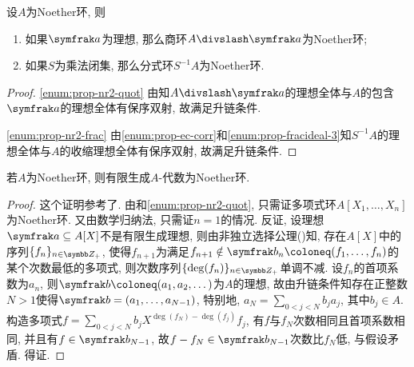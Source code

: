 
\begin{proposition}\label{prop:noetherring2}
  设$A$为Noether环, 则
  \begin{enumerate}
    \item\label{enum:prop-nr2-quot} 如果$\ideal{a}$为理想, 那么商环$A{\divslash}\ideal{a}$为Noether环;
    \item\label{enum:prop-nr2-frac} 如果$S$为乘法闭集, 那么分式环$S^{-1}A$为Noether环.
  \end{enumerate}
\end{proposition}

\begin{proof}
  \ref{enum:prop-nr2-quot} 由知$A{\divslash}\ideal{a}$的理想全体与$A$的包含$\ideal{a}$的理想全体有保序双射, 故满足升链条件.

  \ref{enum:prop-nr2-frac} 由\ref{enum:prop-ec-corr}和\ref{enum:prop-fracideal-3}知$S^{-1}A$的理想全体与$A$的收缩理想全体有保序双射, 故满足升链条件.
\end{proof}

\begin{theorem}\label{thm:hilbertbasis}
  若$A$为Noether环, 则有限生成$A$-代数为Noether环.
\end{theorem}

\begin{proof}
  这个证明参考了. 由和\ref{enum:prop-nr2-quot}, 只需证多项式环$A[X_1, \dotsc, X_n]$为Noether环. 又由数学归纳法, 只需证$n=1$的情况. 反证, 设理想$\ideal{a}\subseteq A[X]$不是有限生成理想, 则由非独立选择公理()知, 存在$A[X]$中的序列$\{f_n\}_{n\in\ZZ_+}$, 使得$f_{n+1}$为满足$f_{n+1}\notin \ideal{b}_n\coloneq (f_1, \dotsc, f_{n})$的某个次数最低的多项式, 则次数序列$\{\deg(f_n)\}_{n\in\ZZ_+}$单调不减. 设$f_n$的首项系数为$a_n$, 则$\ideal{b}\coloneq (a_1, a_2, \dotsc)$为$A$的理想, 故由升链条件知存在正整数$N>1$使得$\ideal{b}=(a_1, \dotsc, a_{N-1})$, 特别地, $a_N=\sum_{0<j<N}b_ja_j$, 其中$b_j\in A$. 构造多项式$f=\sum_{0<j<N}b_jX^{\deg(f_N)-\deg(f_j)}f_j$, 有$f$与$f_N$次数相同且首项系数相同, 并且有$f\in\ideal{b}_{N-1}$, 故$f-f_N\in\ideal{b}_{N-1}$次数比$f_N$低, 与假设矛盾. 得证.
\end{proof}

